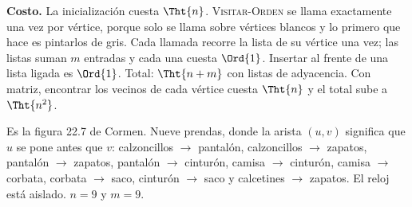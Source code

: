 \documentclass[11pt,letterpaper]{article}
\begin{document}
\textbf{Costo.} La inicialización cuesta $\Tht{n}$.
\textsc{Visitar-Orden} se llama exactamente una vez por vértice,
porque solo se llama sobre vértices blancos y lo primero que hace es
pintarlos de gris. Cada llamada recorre la lista de su vértice una vez;
las listas suman $m$ entradas y cada una cuesta $\Ord{1}$. Insertar al
frente de una lista ligada es $\Ord{1}$. Total: $\Tht{n + m}$ con
listas de adyacencia. Con matriz, encontrar los vecinos de cada vértice
cuesta $\Tht{n}$ y el total sube a $\Tht{n^2}$.

\begin{ejemplo}
  \label{ej:ropa-dfs}
  Es la figura 22.7 de Cormen. Nueve prendas, donde la arista $(u, v)$
  significa que $u$ se pone antes que $v$: calzoncillos $\to$
  pantalón, calzoncillos $\to$ zapatos, pantalón $\to$ zapatos,
  pantalón $\to$ cinturón, camisa $\to$ cinturón, camisa $\to$ corbata,
  corbata $\to$ saco, cinturón $\to$ saco y calcetines $\to$ zapatos.
  El reloj está aislado. $n = 9$ y $m = 9$.


\end{ejemplo}
\end{document}
